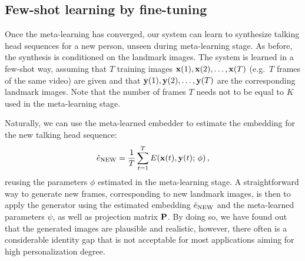 \documentclass[10pt,twocolumn,letterpaper]{article}
\newcommand{\e}{e}
\begin{document}
\subsection{Few-shot learning by fine-tuning}

Once the meta-learning has converged, our system can learn to synthesize talking head sequences for a new person, unseen during meta-learning stage. As before, the synthesis is conditioned on the landmark images. The system is learned in a few-shot way, assuming that $T$ training images $\x(1),\x(2),\dots,\x(T)$ (e.g.\ $T$ frames of the same video) are given and that $\y(1),\y(2),\dots,\y(T)$ are the corresponding landmark images. Note that the number of frames $T$ needs not to be equal to $K$ used in the meta-learning stage. 

Naturally, we can use the meta-learned embedder to estimate the embedding for the new talking head sequence:
\begin{equation} \label{eq:init}
    \hat\e\new = \frac{1}{T} \sum_{t=1}^T E(\x(t),\y(t);\,\phi)\,,
\end{equation}
reusing the parameters $\phi$ estimated in the meta-learning stage. A straightforward way to generate new frames, corresponding to new landmark images, is then to apply the generator using the estimated embedding $\hat\e\new$ and the meta-learned parameters $\psi$, as well as projection matrix $\P$. By doing so, we have found out that the generated images are plausible and realistic, however, there often is a considerable identity gap that is not acceptable for most applications aiming for high personalization degree. 
\end{document}
